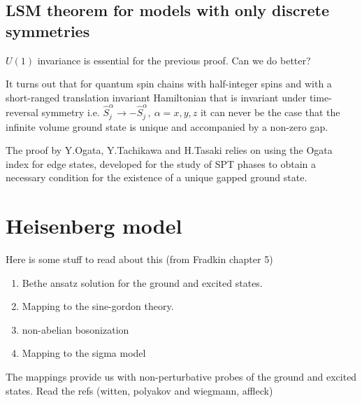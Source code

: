\documentclass{article}
\begin{document}
\subsection{LSM theorem for models with only discrete symmetries}
$U(1)$ invariance is essential for the previous proof. Can we do better?

It turns out that for quantum spin chains with half-integer spins and with a short-ranged translation invariant Hamiltonian that is invariant under time-reversal symmetry i.e. $\hat{S}^{\alpha}_j \to  -\hat{S}^{\alpha}_j,~ \alpha = x, y, z$ it can never be the case that the infinite volume ground state is unique and accompanied by a non-zero gap.

The proof by Y.Ogata, Y.Tachikawa and H.Tasaki relies on using the Ogata index for edge states, developed for the study of SPT phases to obtain a necessary condition for the existence of a unique gapped ground state.
\section{Heisenberg model}
Here is some stuff to read about this (from Fradkin chapter 5)

\begin{enumerate}
    \item Bethe ansatz solution for the ground and excited states.
    \item Mapping to the sine-gordon theory.
    \item non-abelian bosonization
    \item Mapping to the sigma model
\end{enumerate}
The mappings provide us with non-perturbative probes of the ground and excited states. Read the refs (witten, polyakov and wiegmann, affleck)
\end{document}
